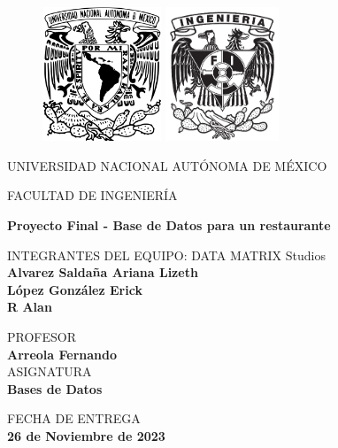 \documentclass[12pt, letterpaper]{article} %
\begin{document}
  
\thispagestyle{empty}
	
	\begin{figure}[h]
		   	          \includegraphics[height=4cm]{Img/Logo_UNAM.png}
			          
	        \endminipage
	\hfill
		           	  \includegraphics[height=4cm]{Img/Logo_Fi.jpg}
		  	          
		    \endminipage
	\end{figure}
	
    \begin{center}
    	\vspace{0.8cm}
    	\LARGE
	    UNIVERSIDAD NACIONAL
	    AUTÓNOMA DE MÉXICO
	
    	\vspace{0.6cm}
    	\LARGE
         {FACULTAD DE INGENIERÍA}
    	
    	\vspace{1 cm}	
    	\LARGE
    	\textbf{Proyecto Final - Base de Datos para un restaurante}
	   
	\vspace{1cm}
	\large
	INTEGRANTES DEL EQUIPO: DATA MATRIX Studios\\
	\vspace{.3cm}
	\large
	\textbf{Alvarez Saldaña Ariana Lizeth\\ López González Erick \\ R Alan }

	\vspace{1cm}
	\large
	PROFESOR \\
	\vspace{0.2cm}
	\large
	\textbf{Arreola Fernando} \\
	\vspace{1cm}
	\large	
	ASIGNATURA \\
	\vspace{.3cm}
	\large
	\textbf{Bases de Datos}
	
	\vspace{1cm}
    \large	
	FECHA DE ENTREGA \\
	\vspace{.3cm}
	\large
	\textbf{26 de Noviembre de 2023}
    \end{center}
\end{document}
